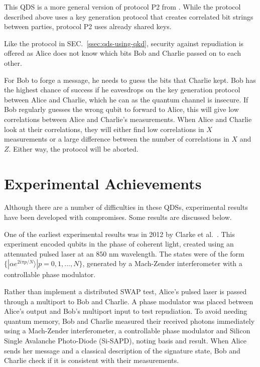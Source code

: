 \documentclass[%
 reprint,
 amsmath,amssymb,
 aps,
 pra,
]{revtex4-1}
\begin{document}
This QDS is a more general version of protocol P2 from \cite{PhysRevA.91.042304}. While the protocol described above uses a key generation protocol that creates correlated bit strings between parties, protocol P2 uses already shared keys.

Like the protocol in SEC.\ \ref{ssec:qds-using-qkd}, security against repudiation is offered as Alice does not know which bits Bob and Charlie passed on to each other.

For Bob to forge a message, he needs to guess the bits that Charlie kept. Bob has the highest chance of success if he eavesdrops on the key generation protocol between Alice and Charlie, which he can as the quantum channel is insecure. If Bob regularly guesses the wrong qubit to forward to Alice, this will give low correlations between Alice and Charlie's measurements. When Alice and Charlie look at their correlations, they will either find low correlations in $X$ measurements or a large difference between the number of correlations in $X$ and $Z$. Either way, the protocol will be aborted.

\section{Experimental Achievements}
\label{sec:experiments}

Although there are a number of difficulties in these QDSs, experimental results have been developed with compromises. Some results are discussed below.

One of the earliest experimental results was in 2012 by Clarke et al.\ \cite{CCD+12}. This experiment encoded qubits in the phase of coherent light, created using an attenuated pulsed laser at an $850 \text{ nm}$ wavelength. The states were of the form $\{|\alpha e^{2i\pi p/N}\rangle| p = 0,1,...,N\}$, generated by a Mach-Zender interferometer with a controllable phase modulator.

Rather than implement a distributed SWAP test, Alice's pulsed laser is passed through a multiport to Bob and Charlie. A phase modulator was placed between Alice's output and Bob's multiport input to test repudiation. To avoid needing quantum memory, Bob and Charlie measured their received photons immediately using a Mach-Zender interferometer, a controllable phase modulator and Silicon Single Avalanche Photo-Diode (Si-SAPD), noting basis and result. When Alice sends her message and a classical description of the signature state, Bob and Charlie check if it is consistent with their measurements.
\end{document}
